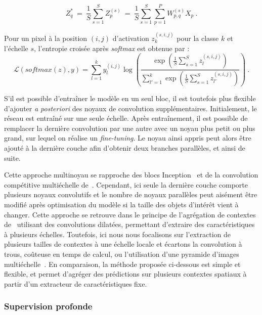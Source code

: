 \begin{equation}
Z^*_q \  = \  \frac{1}{S} \sum_{s=1}^S Z_p^{(s)} \  = \  \frac{1}{S} \sum_{s=1}^S \sum_{p=1}^P W_{p,q}^{(s)} X_p~.
\end{equation}

Pour un pixel à la position $(i,j)$ d'activation $z_{k}^{(s,i,j)}$ pour la classe $k$ et l'échelle $s$, l'entropie croisée après \emph{softmax} est obtenue par :
\begin{equation}
\mathcal{L}(\mathit{softmax}(z),y) = \sum_{l=1}^{k} y_l^{(i,j)} \log\left(\frac{\exp\left(\frac{1}{S} \sum\limits_{s=1}^S {z_{l}^{(s,i,j)}}\right)}{\sum\limits_{l'=1}^k \exp\left(\frac{1}{S} \sum\limits_{s=1}^S{z_{l'}^{(s,i,j)}}\right)}\right)~.
\end{equation}

S'il est possible d'entraîner le modèle en un seul bloc, il est toutefois plus flexible d'ajouter \emph{a posteriori} des noyaux de convolution supplémentaires. Initialement, le réseau est entraîné sur une seule échelle. Après entraînement, il est possible de remplacer la dernière convolution par une autre avec un noyau plus petit ou plus grand, sur lequel on réalise un \emph{fine-tuning}. Le noyau ainsi appris peut alors être ajouté à la dernière couche afin d'obtenir deux branches parallèles, et ainsi de suite.

Cette approche multinoyau se rapproche des blocs Inception~\cite{szegedy_going_2015} et de la convolution compétitive multiéchelle de~\citet{liao_competitive_2015}. Cependant, ici seule la dernière couche comporte plusieurs noyaux convolutifs et le nombre de noyaux parallèles peut aisément être modifié après optimisation du modèle si la taille des objets d'intérêt vient à changer. Cette approche se retrouve dans le principe de l'agrégation de contextes de~\citet{yu_multi-scale_2015} utilisant des convolutions dilatées, permettant d'extraire des caractéristiques à plusieurs échelles. Toutefois, ici nous nous focalisons sur l'extraction de plusieurs tailles de contextes à une échelle locale et écartons la convolution à trous, coûteuse en temps de calcul, ou l'utilisation d'une pyramide d'images multiéchelle~\cite{zhao_learning_2016}. En comparaison, la méthode proposée ci-dessous est simple et flexible, et permet d'agréger des prédictions sur plusieurs contextes spatiaux à partir d'un extracteur de caractéristiques fixe.

\subsubsection{Supervision profonde}
\label{sec:deep_multiscale}

